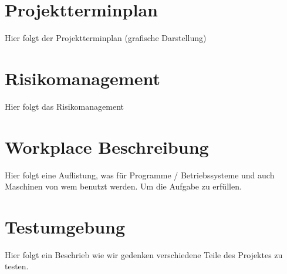 \documentclass[a4paper,10pt,fleqn]{article}
\begin{document}
\section{Projektterminplan}
Hier folgt der Projektterminplan (grafische Darstellung)

\section{Risikomanagement}
Hier folgt das Risikomanagement

\section{Workplace Beschreibung}
Hier folgt eine Auflistung, was für Programme / Betriebssysteme und auch 
Maschinen von wem benutzt werden. Um die Aufgabe zu erfüllen.

\section{Testumgebung}
Hier folgt ein Beschrieb wie wir gedenken verschiedene Teile des Projektes zu 
testen.
\end{document}
